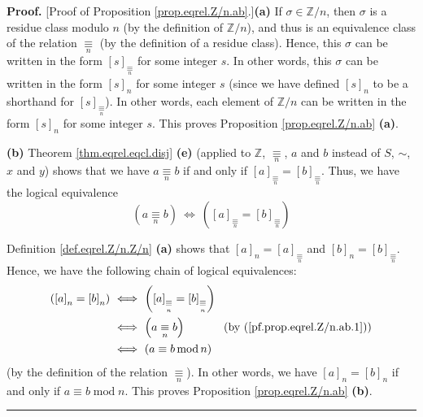 \documentclass[numbers=enddot,12pt,final,onecolumn,notitlepage]{scrartcl}%
\numberwithin{exer}{subsection}
\theoremstyle{definition}
\newenvironment{proof}[1][Proof]{\noindent\textbf{#1.} }{\ \rule{0.5em}{0.5em}}
\begin{document}
\begin{proof}
[Proof of Proposition \ref{prop.eqrel.Z/n.ab}.]\textbf{(a)} If $\sigma
\in\mathbb{Z}/n$, then $\sigma$ is a residue class modulo $n$ (by the
definition of $\mathbb{Z}/n$), and thus is an equivalence class of the
relation $\underset{n}{\equiv}$ (by the definition of a residue class). Hence,
this $\sigma$ can be written in the form $\left[  s\right]
_{\underset{n}{\equiv}}$ for some integer $s$. In other words, this $\sigma$
can be written in the form $\left[  s\right]  _{n}$ for some integer $s$
(since we have defined $\left[  s\right]  _{n}$ to be a shorthand for $\left[
s\right]  _{\underset{n}{\equiv}}$). In other words, each element of
$\mathbb{Z}/n$ can be written in the form $\left[  s\right]  _{n}$ for some
integer $s$. This proves Proposition \ref{prop.eqrel.Z/n.ab} \textbf{(a)}.

\textbf{(b)} Theorem \ref{thm.eqrel.eqcl.disj} \textbf{(e)} (applied to
$\mathbb{Z}$, $\underset{n}{\equiv}$, $a$ and $b$ instead of $S$, $\sim$, $x$
and $y$) shows that we have $a\underset{n}{\equiv}b$ if and only if $\left[
a\right]  _{\underset{n}{\equiv}}=\left[  b\right]  _{\underset{n}{\equiv}}$.
Thus, we have the logical equivalence
\begin{equation}
\left(  a\underset{n}{\equiv}b\right)  \ \Longleftrightarrow\ \left(  \left[
a\right]  _{\underset{n}{\equiv}}=\left[  b\right]  _{\underset{n}{\equiv}%
}\right)  \label{pf.prop.eqrel.Z/n.ab.1}%
\end{equation}


Definition \ref{def.eqrel.Z/n.Z/n} \textbf{(a)} shows that $\left[  a\right]
_{n}=\left[  a\right]  _{\underset{n}{\equiv}}$ and $\left[  b\right]
_{n}=\left[  b\right]  _{\underset{n}{\equiv}}$. Hence, we have the following
chain of logical equivalences:
\begin{align*}
\left(  \left[  a\right]  _{n}=\left[  b\right]  _{n}\right)  \  &
\Longleftrightarrow\ \left(  \left[  a\right]  _{\underset{n}{\equiv}}=\left[
b\right]  _{\underset{n}{\equiv}}\right) \\
&  \Longleftrightarrow\ \left(  a\underset{n}{\equiv}b\right)
\ \ \ \ \ \ \ \ \ \ \left(  \text{by (\ref{pf.prop.eqrel.Z/n.ab.1})}\right) \\
&  \Longleftrightarrow\ \left(  a\equiv b\operatorname{mod}n\right)
\end{align*}
(by the definition of the relation $\underset{n}{\equiv}$). In other words, we
have $\left[  a\right]  _{n}=\left[  b\right]  _{n}$ if and only if $a\equiv
b\operatorname{mod}n$. This proves Proposition \ref{prop.eqrel.Z/n.ab}
\textbf{(b)}.
\end{proof}
\end{document}
